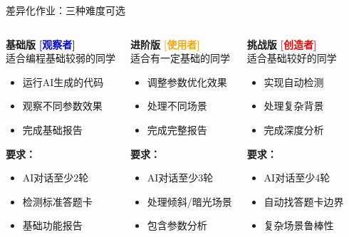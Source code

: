 \begin{frame}{差异化作业：三种难度可选}
	\begin{columns}
		\begin{block}{\textbf{基础版}}
			\textcolor{blue}{\textbf{[观察者]}}\\适合编程基础较弱的同学
			\begin{itemize}
				\item 运行AI生成的代码
				\item 观察不同参数效果
				\item 完成基础报告
			\end{itemize}
			\vspace{0.2cm}
			\textbf{要求：}
			\begin{itemize}
				\item AI对话至少2轮
				\item 检测标准答题卡
				\item 基础功能报告
			\end{itemize}
		\end{block}

		\begin{block}{\textbf{进阶版}}
			\textcolor{orange}{\textbf{[使用者]}}\\适合有一定基础的同学
			\begin{itemize}
				\item 调整参数优化效果
				\item 处理不同场景
				\item 完成完整报告
			\end{itemize}
			\vspace{0.2cm}
			\textbf{要求：}
			\begin{itemize}
				\item AI对话至少3轮
				\item 处理倾斜/暗光场景
				\item 包含参数分析
			\end{itemize}
		\end{block}

		\begin{block}{\textbf{挑战版}}
			\textcolor{red}{\textbf{[创造者]}}\\适合基础较好的同学
			\begin{itemize}
				\item 实现自动检测
				\item 处理复杂背景
				\item 完成深度分析
			\end{itemize}
			\vspace{0.2cm}
			\textbf{要求：}
			\begin{itemize}
				\item AI对话至少4轮
				\item 自动找答题卡边界
				\item 复杂场景鲁棒性
			\end{itemize}
		\end{block}
	\end{columns}
\end{frame}

